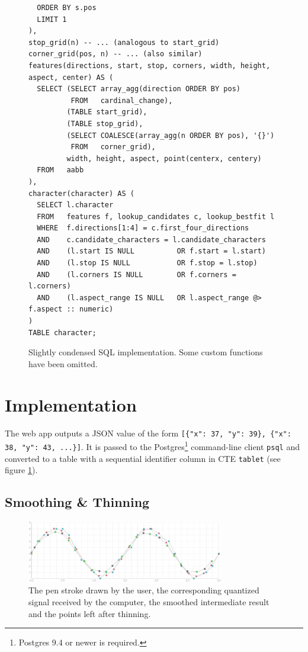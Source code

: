 \documentclass[sigconf]{acmart}
\begin{document}
\begin{figure}[tpb]
\begin{verbatim}
  ORDER BY s.pos
  LIMIT 1
),
stop_grid(n) -- ... (analogous to start_grid)
corner_grid(pos, n) -- ... (also similar)
features(directions, start, stop, corners, width, height, aspect, center) AS (
  SELECT (SELECT array_agg(direction ORDER BY pos)
          FROM   cardinal_change),
         (TABLE start_grid),
         (TABLE stop_grid),
         (SELECT COALESCE(array_agg(n ORDER BY pos), '{}')
          FROM   corner_grid),
         width, height, aspect, point(centerx, centery)
  FROM   aabb
),
character(character) AS (
  SELECT l.character
  FROM   features f, lookup_candidates c, lookup_bestfit l
  WHERE  f.directions[1:4] = c.first_four_directions
  AND    c.candidate_characters = l.candidate_characters
  AND    (l.start IS NULL          OR f.start = l.start)
  AND    (l.stop IS NULL           OR f.stop = l.stop)
  AND    (l.corners IS NULL        OR f.corners = l.corners)
  AND    (l.aspect_range IS NULL   OR l.aspect_range @> f.aspect :: numeric)
)
TABLE character;
  \end{verbatim}
  \caption{Slightly condensed SQL implementation. Some custom functions have been omitted.}
  \label{code}
\end{figure}

\section{Implementation}

The web app outputs a JSON value of the form \texttt{[\{"x": 37, "y": 39\}, \{"x": 38, "y": 43, ...\}]}. It is passed to the Postgres\footnote{Postgres 9.4 or newer is required.} command-line client \texttt{psql} and converted to a table with a sequential identifier column in CTE \texttt{tablet} (see figure \ref{code}).

\subsection{Smoothing \& Thinning}

\begin{figure}[pb]
  \centering
  \includegraphics[width=8.6cm]{smoothingthinning}
  \caption{The {\color[HTML]{BE7777}\huge\textbullet} pen stroke drawn by the user, the corresponding {\color[HTML]{52B1C6}\huge\textbullet} quantized signal received by the computer, the {\color[HTML]{777777}\huge\textbullet} smoothed intermediate result and {\color[HTML]{74C974}\huge\textbullet} the points left after thinning.}
  \label{smoothingthinning}
\end{figure}
\end{document}
